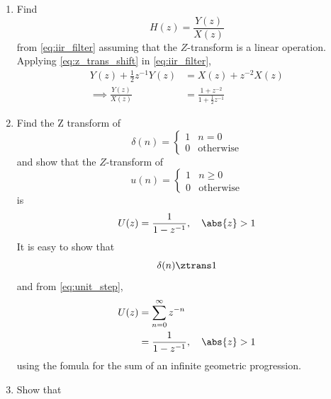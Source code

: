 \documentclass[journal, 12pt, twocolumn]{IEEEtran}
\renewcommand\thesection{\arabic{section}}
\begin{document}
\begin{enumerate}[label=\thesection.\arabic*]
	\item Find
	      \begin{equation}
		      H(z) = \frac{Y(z)}{X(z)}
	      \end{equation}
	      from  \eqref{eq:iir_filter} assuming that the $Z$-transform is a linear operation.
	      \\
	      \solution  Applying \eqref{eq:z_trans_shift} in \eqref{eq:iir_filter},
	      \begin{align}
		      Y(z) + \frac{1}{2}z^{-1}Y(z) & = X(z)+z^{-2}X(z)
		      \\
		      \implies \frac{Y(z)}{X(z)}   & = \frac{1 + z^{-2}}{1 + \frac{1}{2}z^{-1}}
		      \label{eq:freq_resp}
	      \end{align}
	\item Find the Z transform of
	      \begin{equation}
		      \delta(n)
		      =
		      \begin{cases}
			      1 & n = 0
			      \\
			      0 & \text{otherwise}
		      \end{cases}
	      \end{equation}
	      and show that the $Z$-transform of
	      \begin{equation}
		      \label{eq:unit_step}
		      u(n)
		      =
		      \begin{cases}
			      1 & n \ge 0
			      \\
			      0 & \text{otherwise}
		      \end{cases}
	      \end{equation}
	      is
	      \begin{equation}
		      U(z) = \frac{1}{1-z^{-1}}, \quad \abs{z} > 1
	      \end{equation}
	      \solution It is easy to show that
	      \begin{equation}
		      \delta(n) \ztrans 1
	      \end{equation}
	      and from \eqref{eq:unit_step},
	      \begin{align}
		      U(z) & = \sum _{n= 0}^{\infty}z^{-n}
		      \\
		           & =\frac{1}{1-z^{-1}}, \quad \abs{z} > 1 \label{eq:unitstepztrans}
	      \end{align}
	      using the fomula for the sum of an infinite geometric progression.
	\item Show that
	      \begin{equation}

\end{equation}
\end{enumerate}
\end{document}
